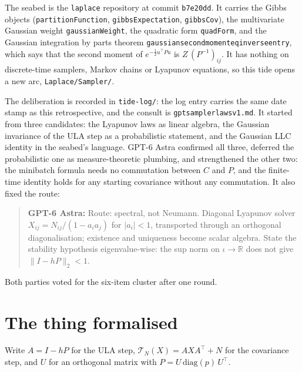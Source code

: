 \documentclass[11pt]{article}
\newcommand{\R}{\mathbb{R}}
\newcommand{\code}[1]{{\def\_{\textunderscore\allowbreak}\texttt{#1}}}
\newcommand{\gptbox}[1]{\par\medskip\begin{quote}\small\textbf{\textcolor{green!50!black}{GPT-6 Astra:}} #1\end{quote}\medskip}
\begin{document}
The seabed is the \code{laplace} repository at commit \code{b7e20dd}. It
carries the Gibbs objects (\code{partitionFunction},
\code{gibbsExpectation}, \code{gibbsCov}), the multivariate Gaussian
weight \code{gaussianWeight}, the quadratic form \code{quadForm}, and
the Gaussian integration by parts theorem
\code{gaussian\_second\_moment\_eq\_inverse\_entry}, which says that the
second moment of $e^{-\frac12 u^\top Pu}$ is $Z\,(P^{-1})_{ij}$. It has
nothing on discrete-time samplers, Markov chains or Lyapunov equations,
so this tide opens a new arc, \code{Laplace/Sampler/}.

The deliberation is recorded in \code{tide-log/}: the log entry carries
the same date stamp as this retrospective, and the consult is
\code{gpt\_sampler\_laws\_v1.md}. It started from three candidates: the Lyapunov laws as linear algebra, the Gaussian
invariance of the ULA step as a probabilistic statement, and the Gaussian
LLC identity in the seabed's language. GPT-6 Astra confirmed all three,
deferred the probabilistic one as measure-theoretic plumbing, and
strengthened the other two: the minibatch formula needs no commutation
between $C$ and $P$, and the finite-time identity holds for any starting
covariance without any commutation. It also fixed the route:
\gptbox{Route: spectral, not Neumann. Diagonal Lyapunov solver
$X_{ij} = N_{ij}/(1 - a_ia_j)$ for $|a_i| < 1$, transported through an
orthogonal diagonalisation; existence and uniqueness become scalar
algebra. State the stability hypothesis eigenvalue-wise: the sup norm on
$\iota \to \R$ does not give $\|I - hP\|_2 < 1$.}
Both parties voted for the six-item cluster after one round.

\section{The thing formalised}

Write $A = I - hP$ for the ULA step, $\mathcal T_N(X) = AXA^\top + N$ for
the covariance step, and $U$ for an orthogonal matrix with $P = U\,
\mathrm{diag}(p)\,U^\top$.
\end{document}
